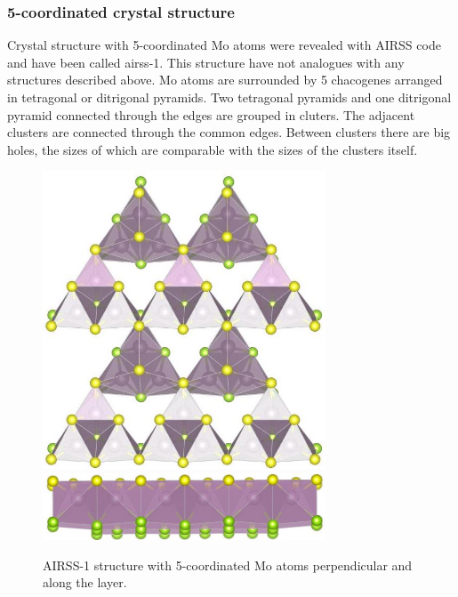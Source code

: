 \documentclass[a4paperm]{article}
\begin{document}
\subsubsection{5-coordinated crystal structure}

Crystal structure with 5-coordinated Mo atoms were revealed with AIRSS code and have been called airss-1.
This structure have not analogues with any structures described above.
Mo atoms are surrounded by 5 chacogenes arranged in tetragonal or ditrigonal pyramids.
Two tetragonal pyramids and one ditrigonal pyramid connected through the edges are grouped in cluters.
The adjacent clusters are connected through the common edges.
Between clusters there are big holes, the sizes of which are comparable with the sizes of the clusters itself.

\begin{figure}[H]
        \includegraphics[width=0.75\textwidth]{airss-1-1.jpg} \\ \vspace{3mm}
        \includegraphics[width=0.75\textwidth]{airss-1-2.jpg}
        \caption{AIRSS-1 structure with 5-coordinated Mo atoms perpendicular and along the layer.}
\label{airss-1}
\end{figure}
\end{document}

